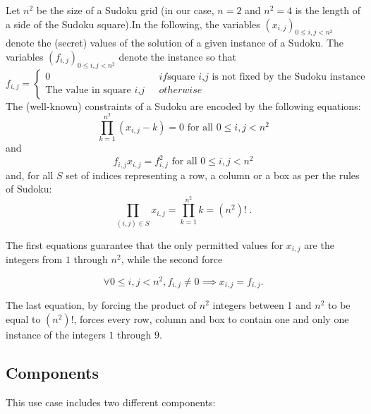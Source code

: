 \documentclass[10pt,a4paper]{article}
\begin{document}
Let $n^2$ be the size of a Sudoku grid (in our case, $n=2$ and $n^2 = 4$ is the length of a side of the Sudoku square).In the following, the variables $(x_{i,j})_{0 \leq i,j < n^2}$ denote the (secret) values of the solution of a given instance of a Sudoku. The variables $(f_{i,j})_{0 \leq i,j < n^2}$ denote the instance so that
\begin{equation}
f_{i,j} =
\begin{cases*}
0 & if \textrm{square $i$,$j$ is not fixed by the Sudoku instance}\\
\textrm{The value in square $i$,$j$ }        & otherwise
\end{cases*}
\end{equation}
The (well-known) constraints of a Sudoku are encoded by the following equations:
\[ \prod_{k=1}^{n^2} \left( x_{i,j} - k \right) = 0 \textrm{ for all $0 \leq i,j < n^2$} \]
and
\[ f_{i,j} x_{i,j} = f_{i,j}^2 \textrm{ for all $0 \leq i,j < n^2$}\]
and, for all $S$ set of indices representing a row, a column or a box as per the rules of Sudoku:
\[ \prod_{(i,j) \in S} x_{i,j} = \prod_{k=1}^{n^2} k = \left(n^2\right)! \; .\]


The first equations guarantee that the only permitted values for $x_{i,j}$ are the integers from $1$ through $n^2$, while the second force

\[ \forall 0 \leq i,j < n^2, f_{i,j} \neq 0 \implies x_{i,j} = f_{i,j}.\]

The last equation, by forcing the product of $n^2$ integers between 1 and $n^2$ to be equal to $\left(n^2\right)!$, forces every row, column and box to contain one and only one instance of the integers $1$ through $9$.


\subsection{Components}
\label{subsec:components}

This use case includes two different components:
\end{document}
